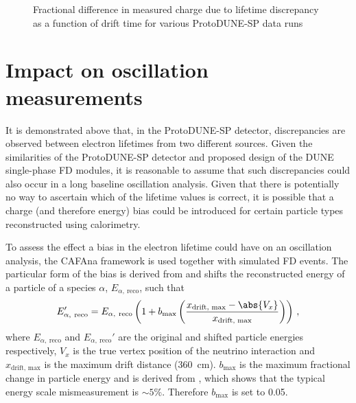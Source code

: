 \begin{figure}[h]
	\begin{adjustbox}{max totalsize=.6\linewidth, center}
		
	\end{adjustbox}
	\caption[Fractional difference in measured charge due to lifetime discrepancy as a function of drift time]{Fractional difference in measured charge due to lifetime discrepancy as a function of drift time for various ProtoDUNE-SP data runs}
	\label{fig:chargeEquivalent}
\end{figure}

\section{Impact on oscillation measurements}
\label{sec:pdune_calibration:osc}

It is demonstrated above that, in the ProtoDUNE-SP detector, discrepancies are observed between electron lifetimes from two different sources. 
Given the similarities of the ProtoDUNE-SP detector and proposed design of the DUNE single-phase FD modules, it is reasonable to assume that such discrepancies could also occur in a long baseline oscillation analysis.  
Given that there is potentially no way to ascertain which of the lifetime values is correct, it is possible that a charge (and therefore energy) bias could be introduced for certain particle types reconstructed using calorimetry.

To assess the effect a bias in the electron lifetime could have on an oscillation analysis, the CAFAna framework is used together with simulated FD events.
The particular form of the bias is derived from  and shifts the reconstructed energy of a particle of a species $\alpha$, $E_{\alpha,~\text{reco}}$, such that
\begin{equation}
	E_{\alpha,~\text{reco}}' = E_{\alpha,~\text{reco}} \left( 1 + b_{\text{max}} \left( \frac{ x_{\text{drift, max}} - \abs{V_{x}} }{ x_{\text{drift, max}} } \right) \right) \, ,
\end{equation}
where $E_{\alpha,~\text{reco}}$ and $E_{\alpha,~\text{reco}}'$ are the original and shifted particle energies respectively, $V_{x}$ is the true vertex position of the neutrino interaction and $x_{\text{drift, max}}$ is the maximum drift distance (\SI{360}{\cm}).
$b_{\text{max}}$ is the maximum fractional change in particle energy and is derived from , which shows that the typical energy scale mismeasurement is $\sim 5 \%$.
Therefore $b_{\text{max}}$ is set to \num{0.05}.

